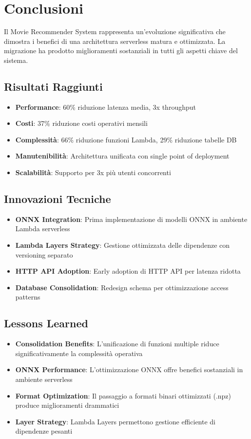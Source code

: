\documentclass[11pt,a4paper]{article}
\begin{document}
\section{Conclusioni}

Il Movie Recommender System rappresenta un'evoluzione significativa che dimostra i benefici di una architettura serverless matura e ottimizzata. La migrazione ha prodotto miglioramenti sostanziali in tutti gli aspetti chiave del sistema.

\subsection{Risultati Raggiunti}
\begin{itemize}
  \item \textbf{Performance}: 60\% riduzione latenza media, 3x throughput
  \item \textbf{Costi}: 37\% riduzione costi operativi mensili
  \item \textbf{Complessità}: 66\% riduzione funzioni Lambda, 29\% riduzione tabelle DB
  \item \textbf{Manutenibilità}: Architettura unificata con single point of deployment
  \item \textbf{Scalabilità}: Supporto per 3x più utenti concorrenti
\end{itemize}

\subsection{Innovazioni Tecniche}
\begin{itemize}
  \item \textbf{ONNX Integration}: Prima implementazione di modelli ONNX in ambiente Lambda serverless
  \item \textbf{Lambda Layers Strategy}: Gestione ottimizzata delle dipendenze con versioning separato
  \item \textbf{HTTP API Adoption}: Early adoption di HTTP API per latenza ridotta
  \item \textbf{Database Consolidation}: Redesign schema per ottimizzazione access patterns
\end{itemize}

\subsection{Lessons Learned}
\begin{itemize}
  \item \textbf{Consolidation Benefits}: L'unificazione di funzioni multiple riduce significativamente la complessità operativa
  \item \textbf{ONNX Performance}: L'ottimizzazione ONNX offre benefici sostanziali in ambiente serverless
  \item \textbf{Format Optimization}: Il passaggio a formati binari ottimizzati (.npz) produce miglioramenti drammatici
  \item \textbf{Layer Strategy}: Lambda Layers permettono gestione efficiente di dipendenze pesanti
\end{itemize}
\end{document}
